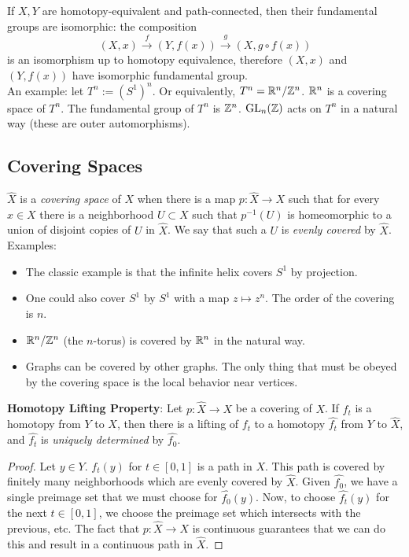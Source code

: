 \documentclass{amsart}
\begin{document}
	 If $X,Y$ are homotopy-equivalent and path-connected, then their fundamental groups are isomorphic: the composition
	 $$
	 (X,x)\xrightarrow{f} (Y,f(x))\xrightarrow{g} (X,g\circ f(x))
	 $$
	 is an isomorphism up to homotopy equivalence, therefore $(X,x)$ and $(Y,f(x))$ have isomorphic fundamental group.\\
	 
	 An example: let $T^n := (S^1)^n$. Or equivalently, $T^n = \mathbb{R}^n/\mathbb{Z}^n$. $\mathbb{R}^n$ is a covering space of $T^n$. The fundamental group of $T^n$ is $\mathbb{Z}^n$. $\operatorname{GL}_n(\mathbb{Z})$ acts on $T^n$ in a natural way (these are outer automorphisms).\\
	 
	 \subsection{Covering Spaces} $\hat{X}$ is a \textit{covering space} of $X$ when there is a map $p: \hat{X}\to X$ such that for every $x\in X$ there is a neighborhood $U\subset X$ such that $p^{-1}(U)$ is homeomorphic to a union of disjoint copies of $U$ in $\hat{X}$. We say that such a $U$ is \textit{evenly covered} by $\hat{X}$.\\
	 
	 Examples:
	 \begin{itemize}
	 \item The classic example is that the infinite helix covers $S^1$ by projection. 
	 \item One could also cover $S^1$ by $S^1$ with a map $z\mapsto z^n$. The order of the covering is $n$.
	 \item $\mathbb{R}^n/\mathbb{Z}^n$ (the $n$-torus) is covered by $\mathbb{R}^n$ in the natural way.
	 \item Graphs can be covered by other graphs. The only thing that must be obeyed by the covering space is the local behavior near vertices.
	 \end{itemize}
	 
	 \noindent \textbf{Homotopy Lifting Property}: Let $p:\hat{X}\to X$ be a covering of $X$. If $f_t$ is a homotopy from $Y$ to $X$, then there is a lifting of $f_t$ to a homotopy $\hat{f_t}$ from $Y$ to $\hat{X}$, and $\hat{f_t}$ is \textit{uniquely determined} by $\hat{f_0}$.
	 
	 \begin{proof}
	 	Let $y\in Y$. $f_t(y)$ for $t\in [0,1]$ is a path in $X$. This path is covered by finitely many neighborhoods which are evenly covered by $\hat{X}$. Given $\hat{f_0}$, we have a single preimage set that we must choose for $\hat{f_0}(y)$. Now, to choose $\hat{f_t}(y)$ for the next $t\in [0,1]$, we choose the preimage set which intersects with the previous, etc. The fact that $p:\hat{X}\to X$ is continuous guarantees that we can do this and result in a continuous path in $\hat{X}$.
	 \end{proof}\\
	 
\end{document}
